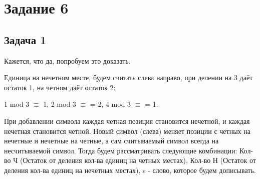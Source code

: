 \documentclass[a4paper,14pt]{article} %
\begin{document}

\section{Задание 6}
\subsection{Задача 1}
Кажется, что да, попробуем это доказать.

Единица на нечетном месте, будем считать слева направо, при делении на 3 даёт остаток 1, на четном даёт остаток 2:

1 mod 3 $\equiv$ 1, 2 mod 3 $\equiv$ = 2, 4 mod 3 $\equiv$ = 1.

При добавлении символа каждая четная позиция становится нечетной, и каждая нечетная становится четной. 
Новый символ (слева) меняет позиции с четных на нечетные и нечетные на четные, а сам считываемый символ всегда на несчитываемой символ.
Тогда будем рассматривать следующие комбинации:
Кол-во Ч (Остаток от деления кол-ва единиц на четных местах),
Кол-во Н (Остаток от деления кол-ва единиц на нечетных местах),
s - слово, которое будем дописывать.
\end{document}
